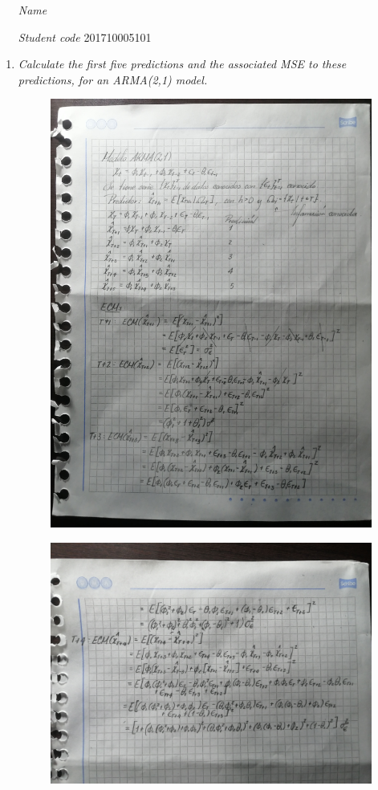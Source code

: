 \documentclass[fleqn]{article}
\begin{document}
 \vspace{0.3cm}
   \begin{itemize}[leftmargin=6.25cm, labelsep=0.5cm]

     \item[\textit{Name}]  %
     \item[\textit{Student code}] 201710005101 %

   \end{itemize}
\vspace{0.3cm}

\begin{enumerate}
\item \textit{Calculate the first five predictions and the associated MSE to these predictions, for an ARMA(2,1) model.}
\begin{figure}[H]
    \centering
    \includegraphics[width=0.8\linewidth]{figs/11.jpg}
\end{figure}
\begin{figure}[H]
    \centering
    \includegraphics[width=0.8\linewidth]{figs/12.jpg}

\end{figure}
\end{enumerate}
\end{document}
